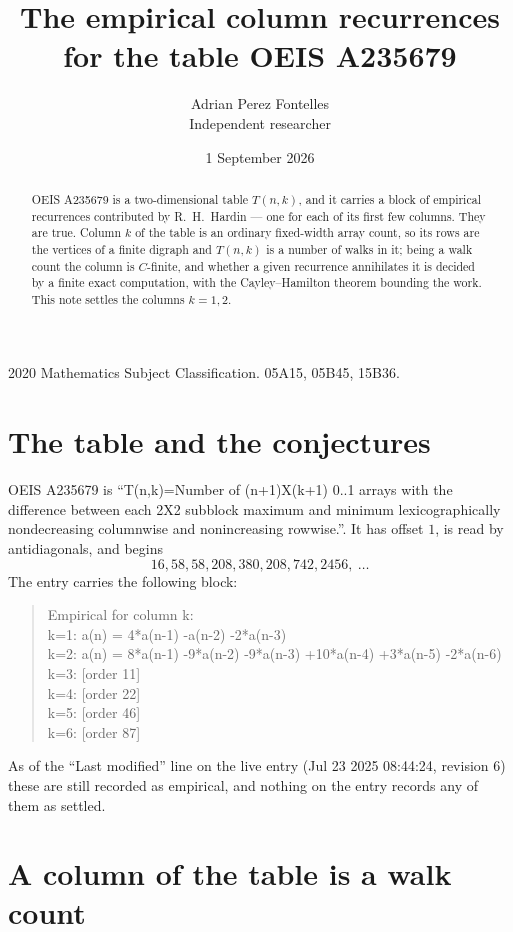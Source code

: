 \documentclass[11pt,a4paper]{article}
\title{The empirical column recurrences for the table OEIS A235679}
\author{Adrian Perez Fontelles\\ \small Independent researcher}
\date{1 September 2026}
\theoremstyle{plain}
\theoremstyle{definition}
\begin{document}
\maketitle

\begin{abstract}
OEIS A235679 is a two-dimensional table $T(n,k)$, and it carries a block of empirical
recurrences contributed by R.~H.~Hardin --- one for each of its first few columns. They are
true. Column $k$ of the table is an ordinary fixed-width array count, so its rows are the
vertices of a finite digraph and $T(n,k)$ is a number of walks in it; being a walk count the
column is $C$-finite, and whether a given recurrence annihilates it is decided by a finite
exact computation, with the Cayley--Hamilton theorem bounding the work. This note settles the columns $k=1, 2$.
\end{abstract}

\noindent\small 2020 Mathematics Subject Classification. 05A15, 05B45, 15B36.\normalsize

\section{The table and the conjectures}

OEIS A235679 is ``T(n,k)=Number of (n+1)X(k+1) 0..1 arrays with the difference between each 2X2 subblock maximum and minimum lexicographically nondecreasing columnwise and nonincreasing rowwise.''. It has offset $1$, is
read by antidiagonals, and begins
\[
16, 58, 58, 208, 380, 208, 742, 2456,\ \dots
\]
The entry carries the following block:
\begin{quote}\small
Empirical for column k:\\
k=1: a(n) = 4*a(n-1) -a(n-2) -2*a(n-3)\\
k=2: a(n) = 8*a(n-1) -9*a(n-2) -9*a(n-3) +10*a(n-4) +3*a(n-5) -2*a(n-6)\\
k=3: [order 11]\\
k=4: [order 22]\\
k=5: [order 46]\\
k=6: [order 87]\\
\end{quote}
As of the ``Last modified'' line on the live entry (Jul 23 2025 08:44:24, revision 6) these are still
recorded as empirical, and nothing on the entry records any of them as settled.

\section{A column of the table is a walk count}
\end{document}
